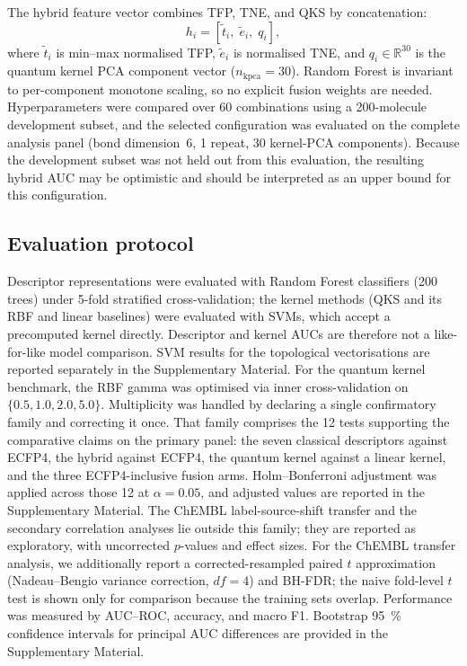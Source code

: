\documentclass[pdflatex,sn-mathphys-num]{sn-jnl}%
\begin{document}
The hybrid feature vector combines TFP, TNE, and QKS by concatenation:
\begin{equation}
h_i = \left[\tilde{t}_i,\; \tilde{e}_i,\; q_i\right],
\end{equation}
where $\tilde{t}_i$ is min--max normalised TFP, $\tilde{e}_i$ is normalised TNE, and $q_i \in \mathbb{R}^{30}$ is the quantum kernel PCA component vector ($n_{\text{kpca}}=30$). Random Forest is invariant to per-component monotone scaling, so no explicit fusion weights are needed. Hyperparameters were compared over 60 combinations using a \num{200}-molecule development subset, and the selected configuration was evaluated on the complete analysis panel (bond dimension~6, \num{1} repeat, \num{30} kernel-PCA components). Because the development subset was not held out from this evaluation, the resulting hybrid AUC may be optimistic and should be interpreted as an upper bound for this configuration.

\subsection{Evaluation protocol}

Descriptor representations were evaluated with Random Forest classifiers (\num{200} trees) under 5-fold stratified cross-validation; the kernel methods (QKS and its RBF and linear baselines) were evaluated with SVMs, which accept a precomputed kernel directly. Descriptor and kernel AUCs are therefore not a like-for-like model comparison. SVM results for the topological vectorisations are reported separately in the Supplementary Material. For the quantum kernel benchmark, the RBF gamma was optimised via inner cross-validation on $\{0.5, 1.0, 2.0, 5.0\}$. Multiplicity was handled by declaring a single confirmatory family and correcting it once. That family comprises the \num{12} tests supporting the comparative claims on the primary panel: the seven classical descriptors against ECFP4, the hybrid against ECFP4, the quantum kernel against a linear kernel, and the three ECFP4-inclusive fusion arms. Holm--Bonferroni adjustment was applied across those \num{12} at $\alpha = \num{0.05}$, and adjusted values are reported in the Supplementary Material. The ChEMBL label-source-shift transfer and the secondary correlation analyses lie outside this family; they are reported as exploratory, with uncorrected $p$-values and effect sizes. For the ChEMBL transfer analysis, we additionally report a corrected-resampled paired $t$ approximation (Nadeau--Bengio variance correction, $df = 4$) and BH-FDR; the naive fold-level $t$ test is shown only for comparison because the training sets overlap. Performance was measured by AUC--ROC, accuracy, and macro F1. Bootstrap \qty{95}{\percent} confidence intervals for principal AUC differences are provided in the Supplementary Material.
\end{document}
